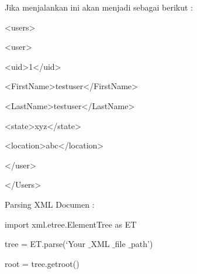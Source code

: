 \noindent 
 \hspace*{0.5in} Jika menjalankan ini akan menjadi sebagai berikut : \par
\noindent 
 {\fontsize{10pt}{10pt}\selectfont <users>} \par
\noindent 
{\fontsize{10pt}{10pt}\selectfont  \hspace*{0.5in} <user>} \par
\noindent 
{\fontsize{10pt}{10pt}\selectfont  \hspace*{0.5in}  \hspace*{0.5in} <uid>1</uid>} \par
\noindent 
{\fontsize{10pt}{10pt}\selectfont  \hspace*{0.5in}  \hspace*{0.5in} <FirstName>testuser</FirstName>} \par
\noindent 
{\fontsize{10pt}{10pt}\selectfont  \hspace*{0.5in}  \hspace*{0.5in} <LastName>testuser</LastName>} \par
\noindent 
{\fontsize{10pt}{10pt}\selectfont  \hspace*{0.5in}  \hspace*{0.5in} <state>xyz</state>} \par
\noindent 
{\fontsize{10pt}{10pt}\selectfont  \hspace*{0.5in}  \hspace*{0.5in} <location>abc</location>} \par
\noindent 
{\fontsize{10pt}{10pt}\selectfont  \hspace*{0.5in} </user>} \par
\noindent 
{\fontsize{10pt}{10pt}\selectfont </Users>} \par
\vspace{10pt}
\noindent 
Parsing XML Documen : \par
\vspace{12pt}
\noindent 
{\fontsize{10pt}{10pt}\selectfont import xml.etree.ElementTree as ET} \par
\noindent 
{\fontsize{10pt}{10pt}\selectfont tree = ET.parse(‘Your $  \_  $XML $  \_  $file $  \_  $path’)} \par
\noindent 
{\fontsize{10pt}{10pt}\selectfont root = tree.getroot()} \par
\noindent 
{\fontsize{10pt}{10pt}\selectfont 



\newpage

}\vspace{10pt}
